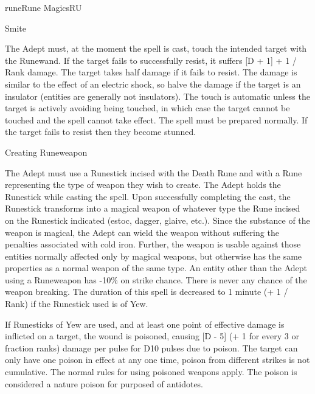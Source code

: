 \begin{college}[1.1]{rune}{Rune Magics}{RU}
\begin{spell}[S-7]{Smite}
\begin{effects}
The Adept must, at the moment the spell is cast, touch the intended
target with the Runewand. If the target fails to successfully resist,
it suffers [D + 1] + 1 / Rank damage.  The target takes half damage if
it fails to resist.  The damage is similar to the effect of an
electric shock, so halve the damage if the target is an insulator
(entities are generally not insulators). The touch is automatic unless
the target is actively avoiding being touched, in which case the
target cannot be touched and the spell cannot take effect.  The spell
must be prepared normally. If the target fails to resist then they
become stunned.
\end{effects}
\end{spell}

\begin{spell}[S-8]{Creating Runeweapon}

\begin{effects}
The Adept must use a Runestick incised with the Death Rune and with a
Rune representing the type of weapon they wish to create.  The Adept
holds the Runestick while casting the spell.  Upon successfully
completing the cast, the Runestick transforms into a magical weapon of
whatever type the Rune incised on the Runestick indicated (estoc,
dagger, glaive, etc.).  Since the substance of the weapon is magical,
the Adept can wield the weapon without suffering the penalties
associated with cold iron.  Further, the weapon is usable against
those entities normally affected only by magical weapons, but
otherwise has the same properties as a normal weapon of the same
type. An entity other than the Adept using a Runeweapon has -10\% on
strike chance. There is never any chance of the weapon breaking.  The
duration of this spell is decreased to 1 minute (+ 1 / Rank) if the
Runestick used is of Yew.

If Runesticks of Yew are used, and at least one point of effective
damage is inflicted on a target, the wound is poisoned, causing [D -
5] (+ 1 for every 3 or fraction ranks) damage per pulse for D10 pulses
due to poison. The target can only have one poison in effect at any
one time, \ie poison from different strikes is not cumulative.  The
normal rules for using poisoned weapons apply.  The poison is
considered a nature poison for purposed of antidotes.


\end{effects}
\end{spell}
\end{college}

